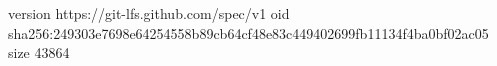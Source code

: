 version https://git-lfs.github.com/spec/v1
oid sha256:249303e7698e64254558b89cb64cf48e83c449402699fb11134f4ba0bf02ac05
size 43864
